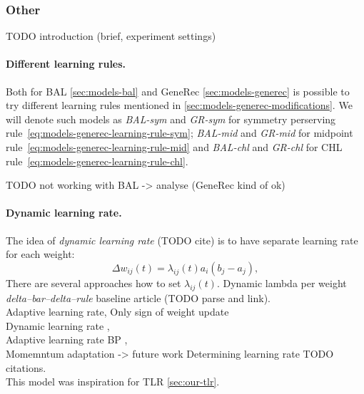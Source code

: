 \subsubsection{Other}
TODO introduction (brief, experiment settings) 

\paragraph{Different learning rules.}
\label{sec:our-learning-rules}

Both for BAL \ref{sec:models-bal} and GeneRec \ref{sec:models-generec} is possible to try different learning rules mentioned in \ref{sec:models-generec-modifications}. We will denote such models as \emph{BAL-sym} and \emph{GR-sym} for symmetry perserving rule~\ref{eq:models-generec-learning-rule-sym}; \emph{BAL-mid} and \emph{GR-mid} for midpoint rule~\ref{eq:models-generec-learning-rule-mid} and \emph{BAL-chl} and \emph{GR-chl} for CHL rule~\ref{eq:models-generec-learning-rule-chl}. 

TODO not working with BAL -> analyse (GeneRec kind of ok) 

\paragraph{Dynamic learning rate.} 
\label{sec:our-dynamic-lambda} 
The idea of \emph{dynamic learning rate} (TODO cite) is to have separate learning rate for each weight: 
\begin{equation}
\Delta w_{ij}(t) = \lambda_{ij}(t) a_i\left(b_j - a_j\right), 
\end{equation}
There are several approaches how to set $\lambda_{ij}(t)$. Dynamic lambda per weight \emph{delta--bar--delta--rule} baseline article \citep{jacobs1988increased} (TODO parse and link). \\
Adaptive learning rate, Only sign of weight update \citep{riedmiller1993direct} \\
Dynamic learning rate \citep{yu1997efficient}, \citep{yu2002backpropagation} \\ 
Adaptive learning rate BP \citep{behera2006adaptive}, \citep{magoulas1999improving} \\
Momemntum adaptation \citep{miniani1990acceleration} -> future work 
Determining learning rate \citep{weir1991method} 
TODO citations.  \\
This model was inspiration for TLR \ref{sec:our-tlr}. 

